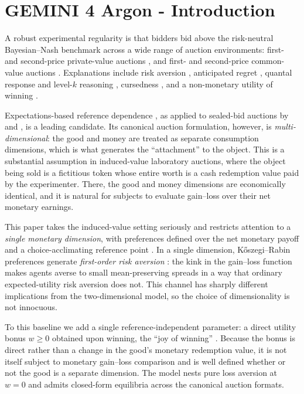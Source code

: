 \documentclass[11pt,a4paper]{article}
\theoremstyle{remark}
\begin{document}
\section{GEMINI 4 Argon - Introduction}
A robust experimental regularity is that bidders bid above the risk-neutral
Bayesian--Nash benchmark across a wide range of auction environments: first- and
second-price private-value auctions \citep{cox1982,coxSmithWalker1988,goeree2002,
crawfordIriberri2007}, and first- and second-price common-value auctions
\citep{kagelLevin1986,eysterRabin2005,crawfordIriberri2007}. Explanations include
risk aversion \citep{cox1982,coxSmithWalker1988}, anticipated regret
\citep{engelbrechtWiggans1989,filizOzbay2007}, quantal response and level-$k$
reasoning \citep{goeree2002,crawfordIriberri2007}, cursedness \citep{eysterRabin2005},
and a non-monetary utility of winning \citep{delgado2008}.

Expectations-based reference dependence \citep{koszegiRabin2006,koszegiRabin2007},
as applied to sealed-bid auctions by \citet{langeRatan2010} and \citet{banerji2014},
is a leading candidate. Its canonical auction formulation, however, is
\emph{multi-dimensional}: the good and money are treated as separate consumption
dimensions, which is what generates the ``attachment'' to the object. This is a
substantial assumption in induced-value laboratory auctions, where the object being
sold is a fictitious token whose entire worth is a cash redemption value paid by the
experimenter. There, the good and money dimensions are economically identical, and
it is natural for subjects to evaluate gain--loss over their net monetary earnings.

This paper takes the induced-value setting seriously and restricts attention to a
\emph{single monetary dimension}, with preferences defined over the net monetary
payoff and a choice-acclimating reference point \citep[CPE;][]{koszegiRabin2007}.
In a single dimension, K\H{o}szegi--Rabin preferences generate \emph{first-order
risk aversion} \citep{koszegiRabin2007}: the kink in the gain--loss function makes
agents averse to small mean-preserving spreads in a way that ordinary
expected-utility risk aversion does not. This channel has sharply different
implications from the two-dimensional model, so the choice of dimensionality is not
innocuous.

To this baseline we add a single reference-independent parameter: a direct utility
bonus $w\ge0$ obtained upon winning, the ``joy of winning'' \citep{delgado2008}.
Because the bonus is direct rather than a change in the good's monetary redemption
value, it is not itself subject to monetary gain--loss comparison and is well
defined whether or not the good is a separate dimension. The model nests pure loss
aversion at $w=0$ and admits closed-form equilibria across the canonical auction
formats.
\end{document}
